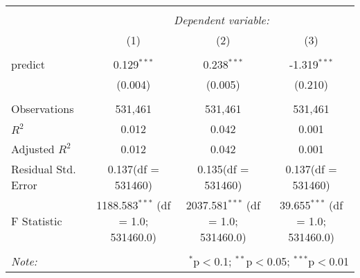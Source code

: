 \begin{table}[!htbp] \centering
\begin{tabular}{@{\extracolsep{5pt}}lccc}
\\[-1.8ex]\hline
\hline \\[-1.8ex]
& \multicolumn{3}{c}{\textit{Dependent variable:}} \
\cr \cline{3-4}
\\[-1.8ex] & (1) & (2) & (3) \\
\hline \\[-1.8ex]
 predict & 0.129$^{***}$ & 0.238$^{***}$ & -1.319$^{***}$ \\
  & (0.004) & (0.005) & (0.210) \\
\hline \\[-1.8ex]
 Observations & 531,461 & 531,461 & 531,461 \\
 $R^2$ & 0.012 & 0.042 & 0.001 \\
 Adjusted $R^2$ & 0.012 & 0.042 & 0.001 \\
 Residual Std. Error & 0.137(df = 531460) & 0.135(df = 531460) & 0.137(df = 531460)  \\
 F Statistic & 1188.583$^{***}$ (df = 1.0; 531460.0) & 2037.581$^{***}$ (df = 1.0; 531460.0) & 39.655$^{***}$ (df = 1.0; 531460.0) \\
\hline
\hline \\[-1.8ex]
\textit{Note:} & \multicolumn{3}{r}{$^{*}$p$<$0.1; $^{**}$p$<$0.05; $^{***}$p$<$0.01} \\
\end{tabular}
\end{table}
